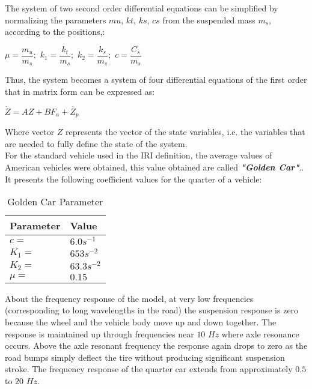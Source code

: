 \documentclass{standalone}
\begin{document}
\noindent The system of two second order differential equations can be simplified by normalizing the parameters $mu$, $kt$, $ks$, $cs$ from the suspended mass $m_{s}$, according to the positions,\cite{gillespie1992everything}:

        \begin{center}
       		$\mu = \dfrac{m_{u}}{m_{s}}; $
        	$k_{1} = \dfrac{k_{t}}{m_{s}} ; $
        	$k_{2} = \dfrac{k_{s}}{m_{s}} ; $
       		$c = \dfrac{C_{s}}{m_{s}}$
		\end{center}


\noindent Thus, the system becomes a system of four differential equations of the first order that in matrix form can be expressed as:
\begin{center}

$\dot{Z} = AZ + BF_{a} + \dot{Z_{p}}$
\end{center}

\noindent Where vector $Z$ represents the vector of the state variables, i.e. the variables that are needed to fully define the state of the system. \\For the standard vehicle used in the IRI definition, the average values of American vehicles were obtained, this value obtained are called \textbf{\textit{"Golden Car"}}.\cite{little_book}.
It presents the following coefficient values for the quarter of a vehicle:


\begin{table}[ht]\label{table:Golden Car Parameter}
\centering
    \begin{tabular}{ | l | l |}

    \hline
    Parameter  & Value \\ \hline


    $c =$ & $6.0s^{-1}$\\ \hline
    $K_{1} =$ & $653s^{-2}$\\ \hline
    $K_{2} =$ & $63.3s^{-2}$\\ \hline
    $\mu =$ & $0.15$\\ \hline

\hline
    \end{tabular}
 \caption{Golden Car Parameter}
\end{table}

\noindent About the frequency response of the model, at very low frequencies (corresponding to long wavelengths in the road) the suspension response is zero because the wheel and the vehicle body move up and down together. The response is maintained up through frequencies near $10$ $Hz$ where axle resonance occurs. Above the axle resonant frequency the response again drops to zero as the road bumps simply deflect the tire without producing significant suspension stroke.
The frequency response of the quarter car extends from approximately $0.5$ to $20$ $Hz$.
\end{document}
